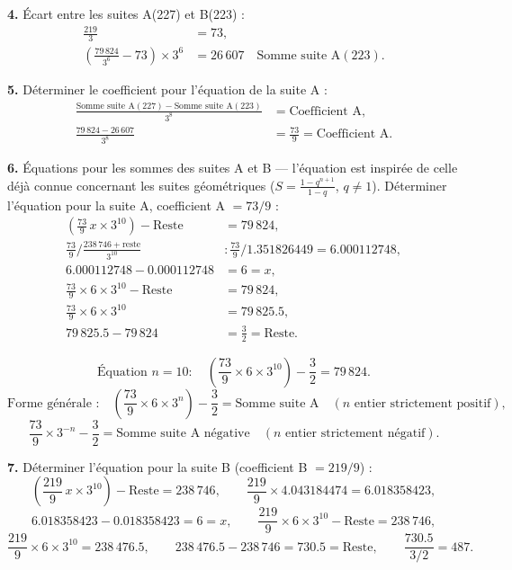 \documentclass[11pt,a4paper]{article}
\begin{document}
\begin{boitenote}
\begin{boitenote}[Inspiration]
\begin{boitenote}
\textbf{4.} Écart entre les suites A(227) et B(223) :
\begin{align*}
\frac{219}{3} &= 73,\\
\left(\frac{79\,824}{3^{6}} - 73\right) \times 3^{6}
&= 26\,607 \quad \text{Somme suite A}(223).
\end{align*}

\textbf{5.} Déterminer le coefficient pour l'équation de la suite A :
\begin{align*}
\frac{\text{Somme suite A}(227) - \text{Somme suite A}(223)}{3^{8}}
&= \text{Coefficient A},\\
\frac{79\,824 - 26\,607}{3^{8}} &= \frac{73}{9} = \text{Coefficient A}.
\end{align*}

\textbf{6.} Équations pour les sommes des suites A et B --- l'équation est
inspirée de celle déjà connue concernant les suites géométriques
($S = \frac{1-q^{n+1}}{1-q}$, $q \neq 1$). Déterminer l'équation pour la
suite A, coefficient A $= 73/9$ :
\begin{align*}
\left(\frac{73}{9}\,x \times 3^{10}\right)-\text{Reste} &= 79\,824,\\
\frac{73}{9}\Big/\frac{238\,746+\text{reste}}{3^{10}}
&\colon \frac{73}{9}/1.351826449 = 6.000112748,\\
6.000112748-0.000112748 &= 6=x,\\
\frac{73}{9}\times6\times3^{10}-\text{Reste} &= 79\,824,\\
\frac{73}{9}\times6\times3^{10} &= 79\,825.5,\\
79\,825.5-79\,824 &= \frac{3}{2}=\text{Reste}.
\end{align*}

\vspace{0.3cm}
\begin{boiteformule}
\[
\text{Équation } n=10 :\quad \left(\frac{73}{9}\times 6 \times 3^{10}\right) - \frac{3}{2} = 79\,824.
\]
\[
\text{Forme générale :}\quad \left(\frac{73}{9}\times 6 \times 3^{n}\right) - \frac{3}{2} = \text{Somme suite A}
\quad (n \text{ entier strictement positif}),
\]
\[
\frac{73}{9}\times 3^{-n} - \frac{3}{2} = \text{Somme suite A négative}
\quad (n \text{ entier strictement négatif}).
\]
\end{boiteformule}

\textbf{7.} Déterminer l'équation pour la suite B (coefficient B $= 219/9$) :
\[
\left(\frac{219}{9}\, x \times 3^{10}\right) - \text{Reste} = 238\,746,
\qquad
\frac{219}{9}\times 4.043184474 = 6.018358423,
\]
\[
6.018358423 - 0.018358423 = 6 = x,
\qquad
\frac{219}{9}\times 6 \times 3^{10} - \text{Reste} = 238\,746,
\]
\[
\frac{219}{9}\times 6 \times 3^{10} = 238\,476.5,
\qquad
238\,476.5 - 238\,746 = 730.5 = \text{Reste},
\qquad
\frac{730.5}{3/2} = 487.
\]


\end{boitenote}
\end{boitenote}
\end{boitenote}
\end{document}
